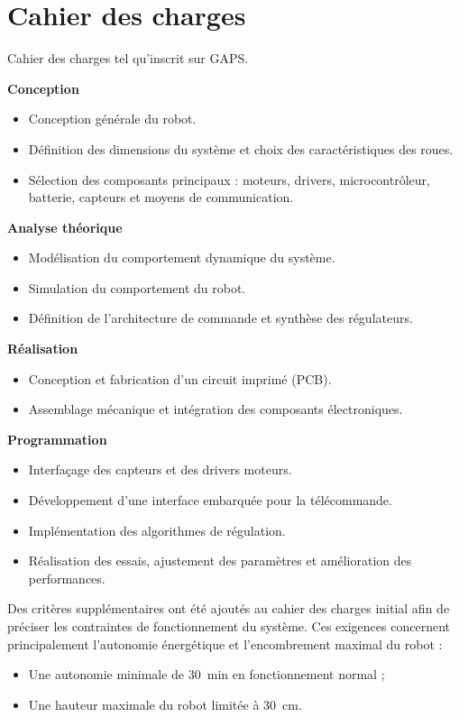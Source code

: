 \section{Cahier des charges}
Cahier des charges tel qu'inscrit sur GAPS.

\textbf{Conception}
\begin{itemize}
    \item Conception générale du robot.
    \item Définition des dimensions du système et choix des caractéristiques des roues.
    \item Sélection des composants principaux : moteurs, drivers, microcontrôleur, batterie, capteurs et moyens de communication.
\end{itemize}

\textbf{Analyse théorique}
\begin{itemize}
    \item Modélisation du comportement dynamique du système.
    \item Simulation du comportement du robot.
    \item Définition de l'architecture de commande et synthèse des régulateurs.
\end{itemize}

\textbf{Réalisation}
\begin{itemize}
    \item Conception et fabrication d'un circuit imprimé (PCB).
    \item Assemblage mécanique et intégration des composants électroniques.
\end{itemize}

\textbf{Programmation}
\begin{itemize}
    \item Interfaçage des capteurs et des drivers moteurs.
    \item Développement d'une interface embarquée pour la télécommande.
    \item Implémentation des algorithmes de régulation.
    \item Réalisation des essais, ajustement des paramètres et amélioration des performances.
\end{itemize}

Des critères supplémentaires ont été ajoutés au cahier des charges initial afin de préciser les contraintes de fonctionnement du système. Ces exigences concernent principalement l'autonomie énergétique et l'encombrement maximal du robot :

\begin{itemize}
    \item Une autonomie minimale de \SI{30}{min} en fonctionnement normal ;
    \item Une hauteur maximale du robot limitée à \SI{30}{cm}.
\end{itemize}